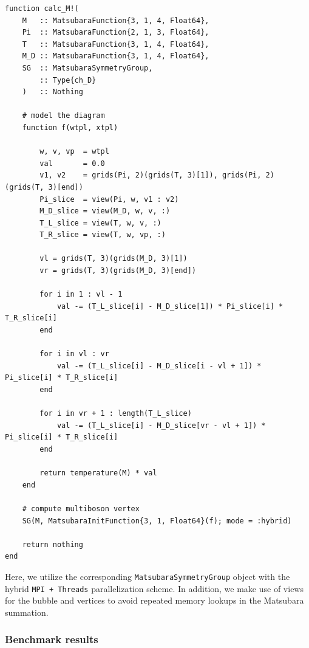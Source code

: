 \documentclass{SciPost}
\begin{document}
\begin{verbatim}
function calc_M!(
    M   :: MatsubaraFunction{3, 1, 4, Float64},
    Pi  :: MatsubaraFunction{2, 1, 3, Float64}, 
    T   :: MatsubaraFunction{3, 1, 4, Float64}, 
    M_D :: MatsubaraFunction{3, 1, 4, Float64}, 
    SG  :: MatsubaraSymmetryGroup,
        :: Type{ch_D}
    )   :: Nothing

    # model the diagram 
    function f(wtpl, xtpl)

        w, v, vp  = wtpl 
        val       = 0.0
        v1, v2    = grids(Pi, 2)(grids(T, 3)[1]), grids(Pi, 2)(grids(T, 3)[end])
        Pi_slice  = view(Pi, w, v1 : v2)
        M_D_slice = view(M_D, w, v, :)
        T_L_slice = view(T, w, v, :)
        T_R_slice = view(T, w, vp, :)

        vl = grids(T, 3)(grids(M_D, 3)[1])
        vr = grids(T, 3)(grids(M_D, 3)[end])

        for i in 1 : vl - 1
            val -= (T_L_slice[i] - M_D_slice[1]) * Pi_slice[i] * T_R_slice[i]
        end 

        for i in vl : vr
            val -= (T_L_slice[i] - M_D_slice[i - vl + 1]) * Pi_slice[i] * T_R_slice[i]
        end

        for i in vr + 1 : length(T_L_slice)
            val -= (T_L_slice[i] - M_D_slice[vr - vl + 1]) * Pi_slice[i] * T_R_slice[i]
        end

        return temperature(M) * val
    end 

    # compute multiboson vertex 
    SG(M, MatsubaraInitFunction{3, 1, Float64}(f); mode = :hybrid)

    return nothing 
end 
\end{verbatim}
%
Here, we utilize the corresponding \texttt{MatsubaraSymmetryGroup} object with the hybrid \texttt{MPI + Threads} parallelization scheme. In addition, we make use of views for the bubble and vertices to avoid repeated memory lookups in the Matsubara summation.

\subsubsection{Benchmark results}
\label{subsec:benchmark}
\end{document}
